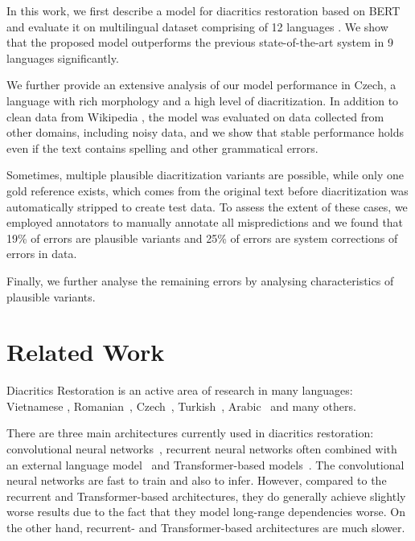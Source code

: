 \documentclass{pbmlarxiv}
\begin{document}
In this work, we first describe a model for diacritics restoration based on BERT and evaluate it on multilingual dataset comprising of 12 languages \cite{naplava2018diacritics}. We show that the proposed model outperforms the previous state-of-the-art system \cite{naplava2018diacritics}
in 9 languages significantly. 

We further provide an extensive analysis of our model performance in Czech, a language with rich morphology and a high level of diacritization. In addition to clean data from Wikipedia \cite{naplava2018diacritics}, the model was evaluated on data collected from other domains, including noisy data, and we show that stable performance holds even if the text contains spelling and other grammatical errors. 

Sometimes, multiple plausible diacritization variants are possible, while only one gold reference exists, which comes from the original text before diacritization was automatically stripped to create test data. To assess the extent of these cases, we employed annotators to manually annotate all mispredictions and we found that 19\% of errors are plausible variants and 25\% of errors are system corrections of errors in data.

Finally, we further analyse the remaining errors by analysing characteristics of plausible variants.


\section{Related Work}

Diacritics Restoration is an active area of research in many languages: Vietnamese \cite{nga2019deep}, Romanian~\cite{nuctu2019deep}, Czech~\cite{naplava2018diacritics}, Turkish~\cite{adali2014vowel}, Arabic~\cite{madhfar2020effective, alkhamissi2020deep} and many others.



There are three main architectures currently used in diacritics restoration: convolutional neural networks~\cite{alqahtani2019efficient}, recurrent neural networks often combined with an external language model~\cite{belinkov2015arabic, naplava2018diacritics, alkhamissi2020deep} and Transformer-based models~\cite{orife2018attentive, mubarak2019highly}. The convolutional neural networks are fast to train and also to infer. However, compared to the recurrent and Transformer-based architectures, they do generally achieve slightly worse results due to the fact that they model long-range dependencies worse. On the other hand, recurrent- and Transformer-based architectures are much slower. 
\end{document}
